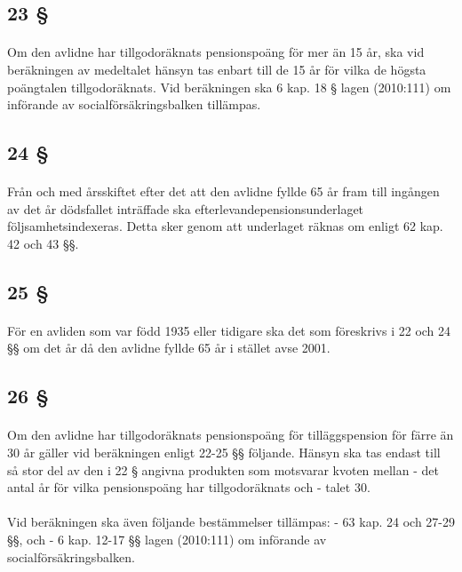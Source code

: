 \documentclass[a4paper,notitlepage,openany,10pt]{book}
\begin{document}
\subsection*{23 §}
\paragraph*{}
Om den avlidne har tillgodoräknats pensionspoäng för mer än 15 år, ska vid beräkningen av medeltalet hänsyn tas enbart till de 15 år för vilka de högsta poängtalen tillgodoräknats.
Vid beräkningen ska 6 kap. 18 § lagen (2010:111) om införande av socialförsäkringsbalken tillämpas.
\subsection*{24 §}
\paragraph*{}
Från och med årsskiftet efter det att den avlidne fyllde 65 år fram till ingången av det år dödsfallet inträffade ska efterlevandepensionsunderlaget följsamhetsindexeras. Detta sker genom att underlaget räknas om enligt 62 kap. 42 och 43 §§.
\subsection*{25 §}
\paragraph*{}
För en avliden som var född 1935 eller tidigare ska det som föreskrivs i 22 och 24 §§ om det år då den avlidne fyllde 65 år i stället avse 2001.
\subsection*{26 §}
\paragraph*{}
Om den avlidne har tillgodoräknats pensionspoäng för tilläggspension för färre än 30 år gäller vid beräkningen enligt 22-25 §§ följande. Hänsyn ska tas endast till så stor del av den i 22 § angivna produkten som motsvarar kvoten mellan
\newline - det antal år för vilka pensionspoäng har tillgodoräknats och
\newline - talet 30.
\paragraph*{}
Vid beräkningen ska även följande bestämmelser tillämpas:
\newline - 63 kap. 24 och 27-29 §§, och
\newline - 6 kap. 12-17 §§ lagen (2010:111) om införande av socialförsäkringsbalken.
\end{document}
